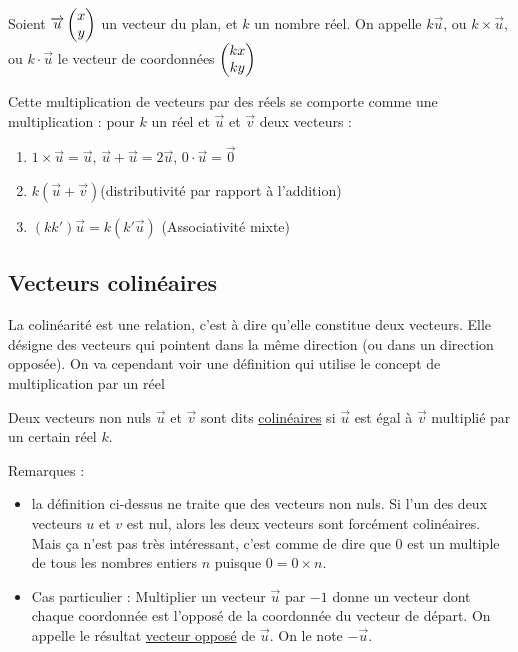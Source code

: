 \documentclass[10pt,a4paper,oneside]{book}
\begin{document}
\begin{de}
  Soient $\overrightarrow{u}  \begin{pmatrix} x\\ y \end{pmatrix}$ un vecteur du plan, et $k$ un nombre réel. On appelle $k \overrightarrow{u}$, ou $k \times \overrightarrow{u}$, ou $k \cdot \overrightarrow{u}$ le vecteur de coordonnées $ \begin{pmatrix} kx\\ ky \end{pmatrix}$  
\end{de}

\begin{prop}
  Cette multiplication de vecteurs par des réels se comporte comme une multiplication : pour $k$ un réel et $\overrightarrow{u}$ et $\overrightarrow{v}$ deux vecteurs : 
  \begin{enumerate}
    \item $1 \times \overrightarrow{u} = \overrightarrow{u}$, $\overrightarrow{u} + \overrightarrow{u} = 2 \overrightarrow{u}$, $0 \cdot \overrightarrow{u}= \overrightarrow{0}$
    \item $k(\overrightarrow{u} + \overrightarrow{v})$(distributivité par rapport à l'addition)
    \item $(kk')\overrightarrow{u} = k(k'\overrightarrow{u})$ (Associativité mixte)
  \end{enumerate}
\end{prop}

\subsection{Vecteurs colinéaires}

La colinéarité est une relation, c'est à dire qu'elle constitue deux vecteurs. Elle désigne des vecteurs qui pointent dans la même direction (ou dans un direction opposée). 
On va cependant voir une définition qui utilise le concept de multiplication par un réel

\begin{de}
  Deux vecteurs non nuls $\overrightarrow{u}$ et $\overrightarrow{v}$ sont dits \underline{colinéaires} si $\overrightarrow{u}$ est égal à $\overrightarrow{v}$ multiplié par un certain réel $k$. 
\end{de}

Remarques : 
\begin{itemize}
  \item la définition ci-dessus ne traite que des vecteurs non nuls. Si l'un des deux vecteurs $u$ et $v$ est nul, alors les deux vecteurs sont forcément colinéaires. Mais ça n'est pas très intéressant, c'est comme de dire que $0$ est un multiple de tous les nombres entiers $n$ puisque $0=0 \times n$.
  \item Cas particulier : Multiplier un vecteur $\overrightarrow{u}$ par $-1$ donne un vecteur dont chaque coordonnée 
  est l'opposé de la coordonnée du vecteur de départ. On appelle le résultat \underline{vecteur opposé} de $\overrightarrow{u}$. On le note $-\overrightarrow{u}$.
\end{itemize}
\end{document}
